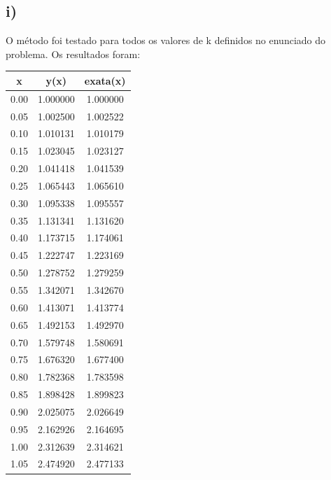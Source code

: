 \documentclass[10pt,a4paper]{article}
\begin{document}
\subsection*{i)}
O método foi testado para todos os valores de k definidos no enunciado do problema. Os resultados foram:
\begin{table}[H]
\centering
\begin{tabular}{|c|c|c|}     
\hline
     x &            y(x) &                 exata(x) \\ 
\hline  
  0.00 &        1.000000 &                 1.000000 \\ 
  0.05 &        1.002500 &                 1.002522 \\ 
  0.10 &        1.010131 &                 1.010179 \\ 
  0.15 &        1.023045 &                 1.023127 \\ 
  0.20 &        1.041418 &                 1.041539 \\ 
  0.25 &        1.065443 &                 1.065610 \\ 
  0.30 &        1.095338 &                 1.095557 \\ 
  0.35 &        1.131341 &                 1.131620 \\ 
  0.40 &        1.173715 &                 1.174061 \\ 
  0.45 &        1.222747 &                 1.223169 \\ 
  0.50 &        1.278752 &                 1.279259 \\ 
  0.55 &        1.342071 &                 1.342670 \\ 
  0.60 &        1.413071 &                 1.413774 \\ 
  0.65 &        1.492153 &                 1.492970 \\ 
  0.70 &        1.579748 &                 1.580691 \\ 
  0.75 &        1.676320 &                 1.677400 \\ 
  0.80 &        1.782368 &                 1.783598 \\ 
  0.85 &        1.898428 &                 1.899823 \\ 
  0.90 &        2.025075 &                 2.026649 \\ 
  0.95 &        2.162926 &                 2.164695 \\ 
  1.00 &        2.312639 &                 2.314621 \\ 
  1.05 &        2.474920 &                 2.477133 \\ 

\end{tabular}
\end{table}
\end{document}

